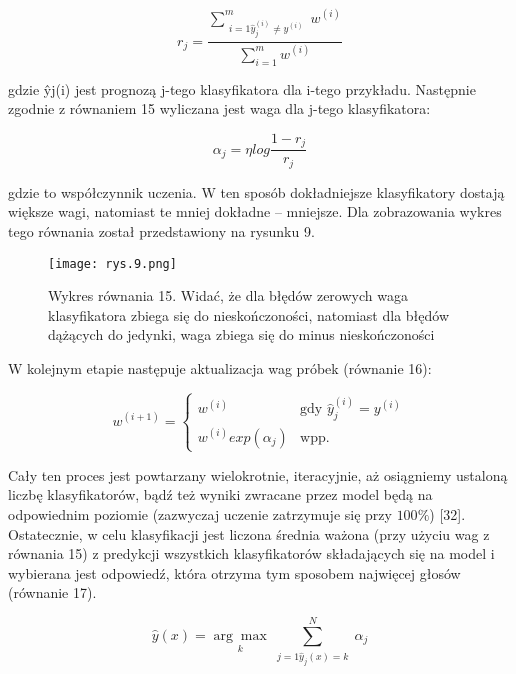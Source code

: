 \begin{equation}
r_j = \frac { \sum\limits_{\substack{i=1
\hat y_j^{(i)} \neq y^{(i)}}}^{m} w^{(i)}}{{\sum\limits_{i=1}^{m} w^{(i)}}}
\end{equation}

\noindent gdzie ŷj(i) jest prognozą j-tego klasyfikatora dla i-tego przykładu. Następnie zgodnie z  równaniem 15 wyliczana jest waga dla j-tego klasyfikatora:

\begin{equation}
\alpha_j=\eta log\frac {1-r_j} {r_j}
\end{equation}

\noindent gdzie to współczynnik uczenia. W ten sposób dokładniejsze klasyfikatory dostają 
większe wagi, natomiast te mniej dokładne – mniejsze. Dla zobrazowania wykres tego równania został przedstawiony na rysunku 9.

\begin{figure}[h]
    \centering
    \texttt{[image: rys.9.png]}
    \caption{Wykres równania 15. Widać, że dla błędów zerowych waga klasyfikatora zbiega się do nieskończoności, natomiast dla błędów dążących do jedynki, waga zbiega się do minus nieskończoności}
    \label{fig:mesh9}
\end{figure}

\noindent W kolejnym etapie następuje aktualizacja wag próbek (równanie 16):

\begin{equation}
w^{(i+1)} =
\begin{cases}
  w^{(i)} & \text{gdy } \hat {y}_j^{(i)} = y^{(i)}\\
  w^{(i)}exp(\alpha_j) & \text{wpp.}
\end{cases}
\end{equation}

\noindent  Cały ten proces jest powtarzany wielokrotnie, iteracyjnie, aż osiągniemy ustaloną liczbę klasyfikatorów, bądź też wyniki zwracane przez model będą na odpowiednim
poziomie (zazwyczaj uczenie zatrzymuje się przy $100\%$) [32]. Ostatecznie, w celu klasyfikacji jest liczona średnia ważona (przy użyciu wag z równania 15) z predykcji wszystkich klasyfikatorów składających się na model i wybierana jest odpowiedź, która otrzyma tym sposobem najwięcej głosów (równanie 17).

\begin{equation}
\hat y (x) = \underset{k}{\arg\max} \sum_{\substack{j=1
\hat y_j(x)=k}}^N \alpha_j
\end{equation}

